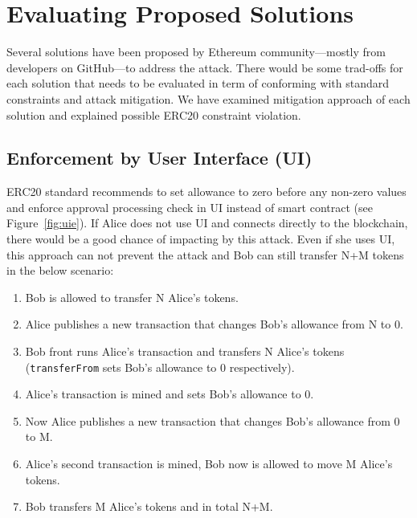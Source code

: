 
\section{Evaluating Proposed Solutions}

Several solutions have been proposed by Ethereum community---mostly from developers on GitHub\cite{Ref07}---to address the attack. There would be some trad-offs for each solution that needs to be evaluated in term of conforming with standard constraints and attack mitigation. We have examined mitigation approach of each solution and explained possible ERC20 constraint violation.

\subsection{Enforcement by User Interface (UI)}
ERC20 standard recommends to set allowance to zero before any non-zero values and enforce approval processing check in UI instead of smart contract (see Figure~\ref{fig:uie}). If Alice does not use UI and connects directly to the blockchain, there would be a good chance of impacting by this attack. Even if she uses UI, this approach can not prevent the attack \cite{Ref14} and Bob can still transfer N+M tokens in the below scenario:
\begin{enumerate}
	\item Bob is allowed to transfer N Alice’s tokens.
	\item Alice publishes a new transaction that changes Bob’s allowance from N to 0.
	\item Bob front runs Alice’s transaction and transfers N Alice’s tokens (\texttt{transferFrom} sets Bob’s allowance to 0 respectively).
	\item Alice’s transaction is mined and sets Bob’s allowance to 0.
	\item Now Alice publishes a new transaction that changes Bob’s allowance from 0 to M.
	\item Alice’s second transaction is mined, Bob now is allowed to move M Alice’s tokens.
	\item Bob transfers M Alice’s tokens and in total N+M.\newline
\end{enumerate}
